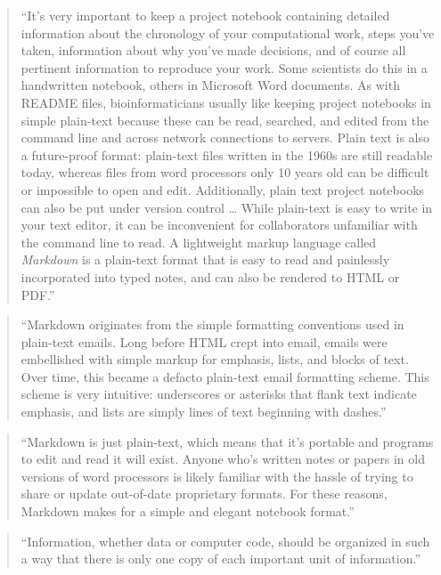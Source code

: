 \documentclass[]{tufte-book}
\begin{document}
\begin{quote}
``It's very important to keep a project notebook containing detailed information
about the chronology of your computational work, steps you've taken, information
about why you've made decisions, and of course all pertinent information to
reproduce your work. Some scientists do this in a handwritten notebook, others in
Microsoft Word documents. As with README files, bioinformaticians usually like keeping
project notebooks in simple plain-text because these can be read, searched, and
edited from the command line and across network connections to servers. Plain text
is also a future-proof format: plain-text files written in the 1960s are still
readable today, whereas files from word processors only 10 years old can be
difficult or impossible to open and edit. Additionally, plain text project notebooks can
also be put under version control \ldots{} While plain-text is easy to write in your
text editor, it can be inconvenient for collaborators unfamiliar with the command
line to read. A lightweight markup language called \emph{Markdown} is a plain-text format
that is easy to read and painlessly incorporated into typed notes, and can also be
rendered to HTML or PDF.'' \citep{buffalo2015bioinformatics}
\end{quote}

\begin{quote}
``Markdown originates from the simple formatting conventions used in plain-text
emails. Long before HTML crept into email, emails were embellished with simple
markup for emphasis, lists, and blocks of text. Over time, this became a defacto
plain-text email formatting scheme. This scheme is very intuitive: underscores or
asterisks that flank text indicate emphasis, and lists are simply lines of text
beginning with dashes.'' \citep{buffalo2015bioinformatics}
\end{quote}

\begin{quote}
``Markdown is just plain-text, which means that it's portable and programs to edit
and read it will exist. Anyone who's written notes or papers in old versions of
word processors is likely familiar with the hassle of trying to share or update
out-of-date proprietary formats. For these reasons, Markdown makes for a simple
and elegant notebook format.'' \citep{buffalo2015bioinformatics}
\end{quote}

\begin{quote}
``Information, whether data or computer code, should be organized in such a way that
there is only one copy of each important unit of information.'' \citep{murrell2009introduction}
\end{quote}
\end{document}
